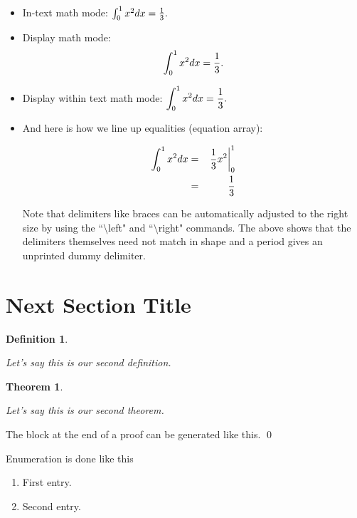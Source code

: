 \documentclass[12pt]{article}
\newtheorem{define}[guess]{Definition}
\newtheorem{theorem}[guess]{Theorem}
\begin{document}
\begin{itemize}
\item
In-text math mode: $\int _0 ^1 x^2 dx = {1\over 3} .$



\item
Display  math mode: $$\int _0 ^1 x^2 dx = {1\over 3} .$$

\item
Display within text math mode: $\displaystyle{ \int _0 ^1 x^2 dx = {1\over 3} .} $

\item
And here is how we line up equalities (equation array):

\begin{eqnarray*}
\int _0 ^1 x^2 dx
& = &
\left. {1\over 3} x^2 \right| _{0} ^1
\\
& = &
{1\over 3}
\end{eqnarray*}

Note that delimiters like braces can be automatically adjusted to the right size
by using the ``$\setminus $left" and ``$\setminus $right" commands.
The above shows that the delimiters themselves need not match in shape and
a period gives an unprinted dummy delimiter.

\end{itemize}




\section{Next Section Title}



\begin{define}
\label{def2}

Let's say this is our second definition.

\end{define}


\begin{theorem}
\label{th2}

Let's say this is our second theorem.

\end{theorem}



The block at the end of a proof can be generated like this. \qed


\vspace{.1in}

Enumeration is done like this

\begin{enumerate}
\item
\label{en1}
First entry.

\item
\label{en2}
Second entry.

\end{enumerate}
\end{document}
